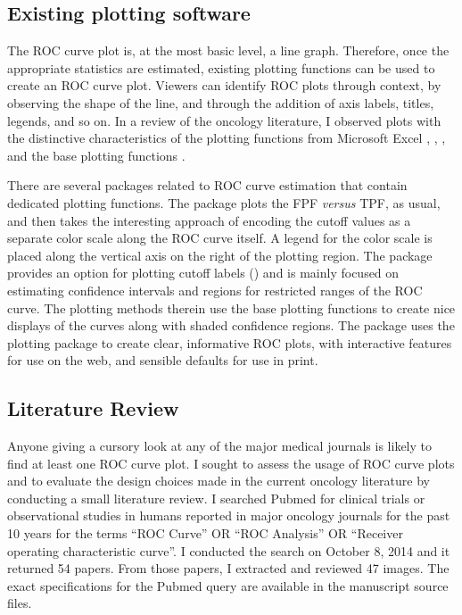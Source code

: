 \documentclass[codesnippet]{jss}
\begin{document}
\subsection{Existing plotting
software}\label{existing-plotting-software}

The ROC curve plot is, at the most basic level, a line graph. Therefore,
once the appropriate statistics are estimated, existing plotting
functions can be used to create an ROC curve plot. Viewers can identify
ROC plots through context, by observing the shape of the line, and
through the addition of axis labels, titles, legends, and so on. In a
review of the oncology literature, I observed plots with the distinctive
characteristics of the plotting functions from Microsoft Excel
\citep{excel},  \citep{sas},  \citep{spss},
and the base  plotting functions \citep{arr}.

There are several  packages related to ROC curve estimation
that contain dedicated plotting functions. The  package
\citep{rocr} plots the FPF \emph{versus} TPF, as usual, and then takes
the interesting approach of encoding the cutoff values as a separate
color scale along the ROC curve itself. A legend for the color scale is
placed along the vertical axis on the right of the plotting region. The
 package \citep{pROC} provides an option for plotting cutoff
labels () and is mainly focused on estimating
confidence intervals and regions for restricted ranges of the ROC curve.
The plotting methods therein use the base  plotting
functions to create nice displays of the curves along with shaded
confidence regions. The  package uses the 
\citep{ggplot2} plotting package to create clear, informative ROC plots,
with interactive features for use on the web, and sensible defaults for
use in print.

\subsection{Literature Review}\label{literature-review}

Anyone giving a cursory look at any of the major medical journals is
likely to find at least one ROC curve plot. I sought to assess the usage
of ROC curve plots and to evaluate the design choices made in the
current oncology literature by conducting a small literature review. I
searched Pubmed for clinical trials or observational studies in humans
reported in major oncology journals for the past 10 years for the terms
``ROC Curve'' OR ``ROC Analysis'' OR ``Receiver operating characteristic
curve''. I conducted the search on October 8, 2014 and it returned 54
papers. From those papers, I extracted and reviewed 47 images. The exact
specifications for the Pubmed query are available in the manuscript
source files.
\end{document}
